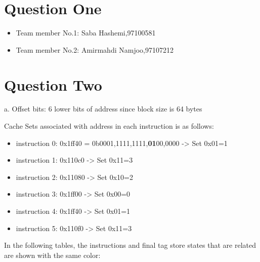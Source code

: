 \documentclass[12pt]{article}
\begin{document}
\section{Question One}

\begin{itemize}
	
	\item Team member No.1: Saba Hashemi,97100581
	\item Team member No.2: Amirmahdi Namjoo,97107212
\end{itemize}


\newpage

\section{Question Two}


a. Offset bits: 6 lower bits of address since block size is 64 bytes

Cache Sets associated with address in each instruction is as follows:

\begin{itemize}
\item instruction 0: 0x1ff40 = 0b0001,1111,1111,\textbf{01}00,0000 -> Set 0x01=1

\item instruction 1: 0x110c0 -> Set 0x11=3

\item instruction 2: 0x11080 -> Set 0x10=2

\item instruction 3: 0x1ff00 -> Set 0x00=0

\item instruction 4: 0x1ff40 -> Set 0x01=1

\item instruction 5: 0x110f0 -> Set 0x11=3

\end{itemize}

In the following tables, the instructions and final tag store states that are related are shown with the same color: 
\end{document}
